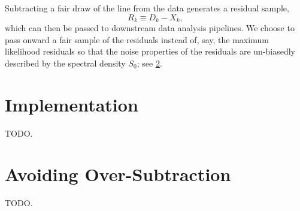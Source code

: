 \documentclass[modern]{aastex631}
\begin{document}
Subtracting a fair draw of the line from the data generates a residual sample, 
\begin{equation}
    R_k \equiv D_k - X_k,
\end{equation}
which can then be passed to downstream data analysis pipelines.  We choose to
pass onward a fair sample of the residuals instead of, say, the maximum
likelihood residuals so that the noise properties of the residuals are
un-biasedly described by the spectral density $S_0$; see
\ref{sec:oversubtract}.

\section{Implementation}

TODO.

\appendix

\section{Avoiding Over-Subtraction}
\label{sec:oversubtract}

TODO.



\end{document}
